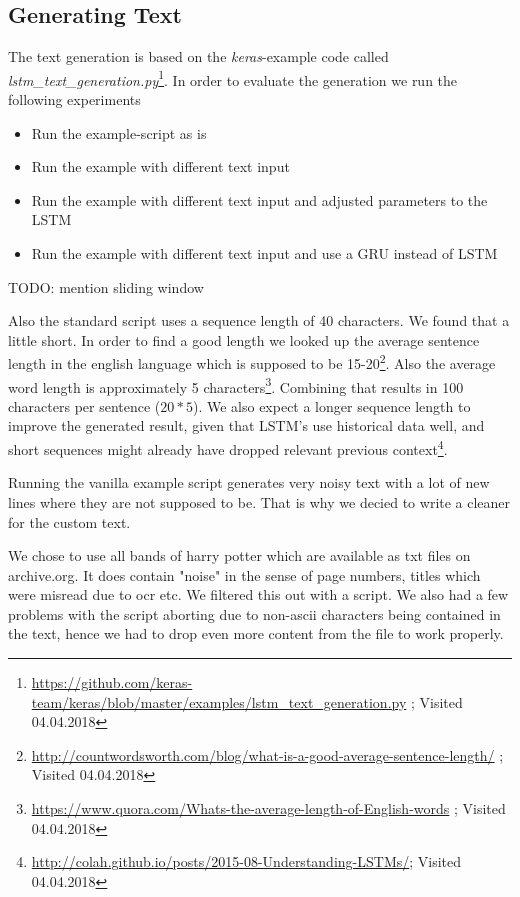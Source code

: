 \documentclass{article}[]
\begin{document}
\subsection{Generating Text}
\label{sec:gen}
The text generation is based on the \textit{keras}-example code called \textit{lstm\_text\_generation.py}\footnote{\url{https://github.com/keras-team/keras/blob/master/examples/lstm_text_generation.py} ; Visited 04.04.2018}.
In order to evaluate the generation we run the following experiments
\begin{itemize}
\item{Run the example-script as is}
\item{Run the example with different text input}
\item{Run the example with different text input and adjusted parameters to the LSTM}
\item{Run the example with different text input and use a GRU instead of LSTM}
\end{itemize}


TODO: mention sliding window


Also the standard script uses a sequence length of 40 characters. We found that a little short. In order to find a good length we looked up the average sentence length in the english language which is supposed to be 15-20\footnote{\url{http://countwordsworth.com/blog/what-is-a-good-average-sentence-length/} ; Visited 04.04.2018}.
Also the average word length is approximately 5 characters\footnote{\url{https://www.quora.com/Whats-the-average-length-of-English-words} ; Visited 04.04.2018}. Combining that results in 100 characters per sentence ($20 * 5$). We also expect a longer sequence length to improve the generated result, given that LSTM's use historical data well, and short sequences might already have dropped relevant previous context\footnote{\url{http://colah.github.io/posts/2015-08-Understanding-LSTMs/}; Visited 04.04.2018}.

Running the vanilla example script generates very noisy text with a lot of new lines where they are not supposed to be. That is why we decied to write a cleaner for the custom text.

We chose to use all bands of harry potter which are available as txt files on archive.org.
It does contain "noise" in the sense of page numbers, titles which were misread due to ocr etc. We filtered this out with a script.
We also had a few problems with the script aborting due to non-ascii characters being contained in the text, hence we had to drop even more content from the file to work properly.
\end{document}
